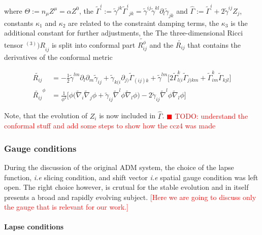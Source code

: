 \documentclass[11pt,a4paper,headinclude=true,DIV=14,BCOR=8mm,chapterprefix,listof=totoc,twoside,openright,abstracton]{scrbook}
\newcommand{\todo}[1]{\textcolor{red}{$\blacksquare$ TODO: #1}}
\newcommand{\red}[1]{\textcolor{red}{#1}}
\begin{document}
where $\Theta:=n_{\mu}Z^{\mu}=\alpha Z^0$, the $\widetilde{\Gamma}^i:=\widetilde{\gamma}^{jk}{\widetilde{\Gamma}^i}_{jk} = \widetilde{\gamma}^{ij}\widetilde{\gamma}^{kl}\partial_{l}\widetilde{\gamma}_{jk}$ and $\hat{\Gamma}:=\widetilde{\Gamma}^i + 2\widetilde{\gamma}^{ij}Z_j$, constants $\kappa_1$ and $\kappa_2$ are related to the constraint damping terms, the $\kappa_3$ is the additional constant for further adjustments, the The three-dimensional Ricci tensor ${^{(3)})R}_{ij}$ is split into conformal part $\widetilde{R_{ij}^{\phi}}$ and the $\widetilde{R_{ij}}$ that contains the derivatives of the conformal metric

\begin{align}
\widetilde{R_{ij}} &= -\frac{1}{2}\widetilde{\gamma}^{lm}\partial_{l}\partial_{m}\widetilde{\gamma}_{ij} + \widetilde{\gamma}_{k(i}\partial_{j)}\widetilde{\Gamma}_{(ij)k} + \widetilde{\gamma}^{lm}\big[2\widetilde{\Gamma}^{k}_{l(i}\widetilde{\Gamma}_{j)km} + \widetilde{\Gamma}^{k}_{im}\widetilde{\Gamma}_{kjl}\big] \\
\widetilde{R_{ij}}^{\phi} &= \frac{1}{\phi^2}\big[\phi\big(\widetilde{\nabla}_{i}\widetilde{\nabla}_{j}\phi + \widetilde{\gamma}_{ij}\widetilde{\nabla}^{l}\phi\widetilde{\nabla}_{l}\phi\big) - 2\widetilde{\gamma}_{ij}\widetilde{\nabla}^{l}\phi\widetilde{\nabla}_{l}\phi\big]
\end{align}

Note, that the evolution of $Z_i$ is now included in $\hat{\Gamma}$. 
\todo{understand the conformal stuff and add some steps to show how the ccz4 was made}


\subsubsection{Gauge conditions}

During the discussion of the original ADM system, the choice of the lapse function, \textit{i.e} slicing condition, and shift vector \textit{i.e} spatial gauge condition was left open. The right choice however, is crutual for the stable evolution and in itself presents a broad and rapidly evolving subject. \red{[Here we are going to discuss only the gauge that is relevant for our work.]} 

\paragraph{Lapse conditions}
\end{document}
